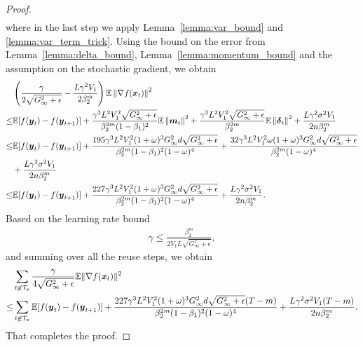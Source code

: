 \begin{proof}
\begin{align*}
\end{align*}
where in the last step we apply  Lemma~\ref{lemma:var_bound} and \ref{lemma:var_term_trick}. Using the bound on the error from Lemma~\ref{lemma:delta_bound}, Lemma~\ref{lemma:momentum_bound} and the assumption on the stochastic gradient, we obtain
\begin{align*}
& \left( \frac{\gamma}{2\sqrt{G_\infty^2+\epsilon}} - \frac{L\gamma^2V_1}{2\beta_2^m}\right) \mathbb E\left\| \nabla f(\boldsymbol{x}_t)\right\|^2 \\
    \leq & \mathbb E [f(\boldsymbol{y}_{t}) - f(\boldsymbol{y}_{t+1})] + \frac{\gamma^3L^2V_1^2\sqrt{G_\infty^2+\epsilon}}{\beta_2^{2m}(1-\beta_1)^2} \mathbb E\left\| \boldsymbol{m}_t\right\|^2 + \frac{\gamma^3L^2V_1^2\sqrt{G_\infty^2+\epsilon}}{\beta_2^{2m}}\mathbb E\left\| \boldsymbol{\delta}_{t} \right\|^2 + \frac{L\gamma^2\sigma^2V_1}{2n\beta_2^m} \\
\leq & \mathbb E [f(\boldsymbol{y}_{t}) - f(\boldsymbol{y}_{t+1})] + \frac{195\gamma^3L^2V_1^2(1+\omega)^3G_\infty^2d\sqrt{G_\infty^2+\epsilon}}{\beta_2^{2m}(1-\beta_1)^2(1-\omega)^4} + \frac{32\gamma^3L^2V_1^2\omega(1+\omega)^3G_\infty^2d\sqrt{G_\infty^2+\epsilon}}{\beta_2^{2m}(1-\omega)^4} \\
& + \frac{L\gamma^2\sigma^2V_1}{2n\beta_2^m} \\
    \leq & \mathbb E [f(\boldsymbol{y}_{t}) - f(\boldsymbol{y}_{t+1})] + \frac{227\gamma^3L^2V_1^2(1+\omega)^3G_\infty^2d\sqrt{G_\infty^2+\epsilon}}{\beta_2^{2m}(1-\beta_1)^2(1-\omega)^4} + \frac{L\gamma^2\sigma^2V_1}{2n\beta_2^m}.
\end{align*}
Based on the learning rate bound
\begin{align*}
    \gamma \leq \frac{\beta_2^m}{2V_1L\sqrt{G_\infty^2+\epsilon}},
\end{align*}
and summing over all the reuse steps, we obtain
\begin{align*}
    & \sum_{t\not\in\mathcal{T}_{\boldsymbol{v}}}\frac{\gamma}{4\sqrt{G_\infty^2+\epsilon}}\mathbb{E}\|\nabla f(\boldsymbol{x}_t)\|^2 \\
\leq & \sum_{t\not\in\mathcal{T}_{\boldsymbol{v}}}\mathbb{E}[f(\boldsymbol{y}_{t}) - f(\boldsymbol{y}_{t+1})]+ \frac{227\gamma^3L^2V_1^2(1+\omega)^3G_\infty^2d\sqrt{G_\infty^2+\epsilon}(T-m)}{\beta_2^{2m}(1-\beta_1)^2(1-\omega)^4} + \frac{L\gamma^2\sigma^2V_1(T-m)}{2n\beta_2^m}.
\end{align*}
That completes the proof.
\end{proof}

